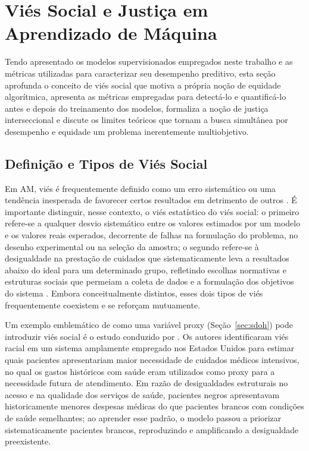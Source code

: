 \section{Viés Social e Justiça em Aprendizado de Máquina}\label{sec:vies_justica}
Tendo apresentado os modelos supervisionados empregados neste trabalho e as métricas utilizadas para caracterizar seu desempenho preditivo, esta seção aprofunda o conceito de viés social que motiva a própria noção de equidade algorítmica, apresenta as métricas empregadas para detectá-lo e quantificá-lo antes e depois do treinamento dos modelos, formaliza a noção de justiça interseccional e discute os limites teóricos que tornam a busca simultânea por desempenho e equidade um problema inerentemente multiobjetivo.

\subsection{Definição e Tipos de Viés Social}\label{subsec:definicao_tipos_vies}

Em AM, viés é frequentemente definido como um erro sistemático ou uma tendência inesperada de favorecer certos resultados em detrimento de outros \cite{mehrabi2021survey}. É importante distinguir, nesse contexto, o viés estatístico do viés social: o primeiro refere-se a qualquer desvio sistemático entre os valores estimados por um modelo e os valores reais esperados, decorrente de falhas na formulação do problema, no desenho experimental ou na seleção da amostra; o segundo refere-se à desigualdade na prestação de cuidados que sistematicamente leva a resultados abaixo do ideal para um determinado grupo, refletindo escolhas normativas e estruturas sociais que permeiam a coleta de dados e a formulação dos objetivos do sistema \cite{parikh2019addressing}. Embora conceitualmente distintos, esses dois tipos de viés frequentemente coexistem e se reforçam mutuamente.

Um exemplo emblemático de como uma variável proxy (Seção~\ref{sec:sdoh}) pode introduzir viés social é o estudo conduzido por \citet{obermeyer2019dissecting}. Os autores identificaram viés racial em um sistema amplamente empregado nos Estados Unidos para estimar quais pacientes apresentariam maior necessidade de cuidados médicos intensivos, no qual os gastos históricos com saúde eram utilizados como proxy para a necessidade futura de atendimento. Em razão de desigualdades estruturais no acesso e na qualidade dos serviços de saúde, pacientes negros apresentavam historicamente menores despesas médicas do que pacientes brancos com condições de saúde semelhantes; ao aprender esse padrão, o modelo passou a priorizar sistematicamente pacientes brancos, reproduzindo e amplificando a desigualdade preexistente.

